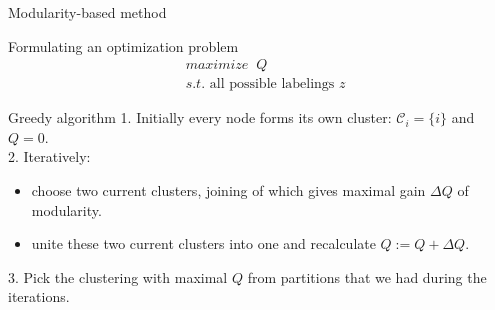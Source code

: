 \documentclass{beamer}
\theoremstyle{definition}
\theoremstyle{plain}
\theoremstyle{remark}
\begin{document}
			\begin{frame}{Modularity-based method}
			\vspace{-5pt}
				\begin{block}{Formulating an optimization problem}
					\begin{equation}
						\begin{aligned}
							&maximize\;\;Q\\
							&s.t. \text{ all possible labelings }z
						\nonumber
						\end{aligned}
					\end{equation}
				\end{block}

				\begin{block}{Greedy algorithm}
						1. Initially every node forms its own cluster: $\mathcal{C}_i = \{ i \}$ and $Q = 0$.\\
						2. Iteratively: 
							\begin{itemize}
								\item choose two current clusters, joining of which gives maximal gain $\Delta Q$ of modularity.
								\item unite these two current clusters into one and recalculate $Q := Q + \Delta Q$.
							\end{itemize}
						3. Pick the clustering with maximal $Q$ from partitions that we had during the iterations.
				\end{block}
			\end{frame}
\end{document}
